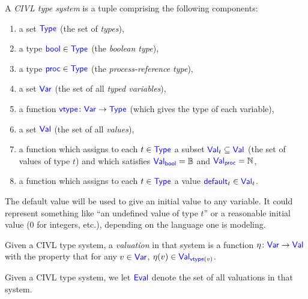 \documentclass[11pt, oneside, letterpaper]{book}
\begin{document}
\begin{definition}
  A \emph{CIVL type system} is a tuple comprising the following
  components:
  \begin{enumerate}
  \item a set $\Type$ (the set of \emph{types}),
  \item a type $\bool\in\Type$ (the \emph{boolean type}),
  \item a type $\proc\in\Type$ (the \emph{process-reference type}),
  \item a set $\Var$ (the set of all \emph{typed variables}),
  \item a function $\vtype\colon \Var\ra\Type$ (which gives the
    type of each variable),
  \item a set $\Val$ (the set of all \emph{values}),
  \item a function which assigns to each $t\in\Type$ a subset
    $\Val_t\subseteq\Val$ (the set of values of type $t$)
    and which satisfies $\Val_{\bool}=\B$ and $\Val_{\proc}=\N$,
  \item a function which assigns to each $t\in\Type$ a value
    $\default_t\in\Val_t$.
  \end{enumerate}
\end{definition}

The default value will be used to give an initial value to any
variable.  It could represent something like ``an undefined value of
type $t$'' or a reasonable initial value ($0$ for integers, etc.),
depending on the language one is modeling.

\begin{definition}
  Given a CIVL type system, a \emph{valuation} in that system is a
  function $\eta\colon\Var\ra\Val$ with the property that for any
  $v\in\Var$, $\eta(v)\in\Val_{\vtype(v)}$.
\end{definition}

Given a CIVL type system, we let $\Eval$ denote the set of all
valuations in that system.
\end{document}
